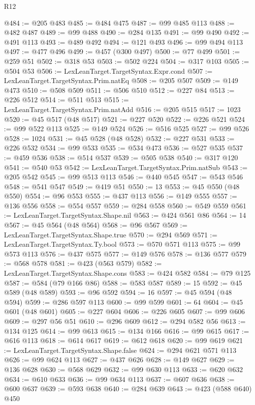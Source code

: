 \begin{lexlean}{R12}
\begin{coremodule}
{{{{{{{{{{{{{{{{{{{{{{{{{{{{{{{{{{{{{{{{{{{{{{{{{{{{{{{{{{{{{{{{{{{{{{{{{{{{{{{{{{{{{{{{{{{{{{{{{{{{{{{{{{@484 := @205 @483
@485 := @484 @475
@487 := @99 @485 @113
@488 := @482 @487
@489 := @99 @488
@490 := @284 @135
@491 := @99 @490
@492 := @491 @113
@493 := @489 @492
@494 := @121 @493
@496 := @99 @494 @113
@497 := @477 @496
@499 := @457 (@300 @497)
@500 := @77 @499
@501 := @259 @51
@502 := @318 @53
@503 := @502 @224
@504 := @317 @103
@505 := @504 @53
@506 := LexLeanTarget.TargetSyntax.Expr.cond
@507 := LexLeanTarget.TargetSyntax.Prim.natEq
@508 := @205 @507
@509 := @149 @473
@510 := @508 @509
@511 := @506 @510
@512 := @227 @84
@513 := @226 @512
@514 := @511 @513
@515 := LexLeanTarget.TargetSyntax.Prim.natAdd
@516 := @205 @515
@517 := 1023
@520 := @45 @517 (@48 @517)
@521 := @227 @520
@522 := @226 @521
@524 := @99 @522 @113
@525 := @149 @524
@526 := @516 @525
@527 := @99 @526
@528 := 1024
@531 := @45 @528 (@48 @528)
@532 := @227 @531
@533 := @226 @532
@534 := @99 @533
@535 := @534 @473
@536 := @527 @535
@537 := @459 @536
@538 := @514 @537
@539 := @505 @538
@540 := @317 @120
@541 := @540 @53
@542 := LexLeanTarget.TargetSyntax.Prim.natSub
@543 := @205 @542
@545 := @99 @513 @113
@546 := @440 @545
@547 := @543 @546
@548 := @541 @547
@549 := @419 @51
@550 := 13
@553 := @45 @550 (@48 @550)
@554 := @96 @553
@555 := @437 @113
@556 := @149 @555
@557 := @136 @556
@558 := @554 @557
@559 := @284 @558
@560 := @549 @559
@561 := LexLeanTarget.TargetSyntax.Shape.nil
@563 := @424 @561 @86
@564 := 14
@567 := @45 @564 (@48 @564)
@568 := @96 @567
@569 := LexLeanTarget.TargetSyntax.Shape.true
@570 := @294 @569
@571 := LexLeanTarget.TargetSyntax.Ty.bool
@573 := @570 @571 @113
@575 := @99 @573 @113
@576 := @437 @575
@577 := @149 @576
@578 := @136 @577
@579 := @568 @578
@581 := @423 (@563 @579)
@582 := LexLeanTarget.TargetSyntax.Shape.cons
@583 := @424 @582
@584 := @79 @125
@587 := @584 (@79 @166 @86)
@588 := @583 @587
@589 := 15
@592 := @45 @589 (@48 @589)
@593 := @96 @592
@594 := 16
@597 := @45 @594 (@48 @594)
@599 := @286 @597 @113
@600 := @99 @599
@601 := 64
@604 := @45 @601 (@48 @601)
@605 := @227 @604
@606 := @226 @605
@607 := @99 @606
@609 := @297 @56 @51
@610 := @296 @609
@612 := @294 @582 @56
@613 := @134 @125
@614 := @99 @613
@615 := @134 @166
@616 := @99 @615
@617 := @616 @113
@618 := @614 @617
@619 := @612 @618
@620 := @99 @619
@621 := LexLeanTarget.TargetSyntax.Shape.false
@624 := @294 @621 @571 @113
@626 := @99 @624 @113
@627 := @437 @626
@628 := @149 @627
@629 := @136 @628
@630 := @568 @629
@632 := @99 @630 @113
@633 := @620 @632
@634 := @610 @633
@636 := @99 @634 @113
@637 := @607 @636
@638 := @600 @637
@639 := @593 @638
@640 := @284 @639
@643 := @423 (@588 @640) @450
}}}}}}}}}}}}}}}}}}}}}}}}}}}}}}}}}}}}}}}}}}}}}}}}}}}}}}}}}}}}}}}}}}}}}}}}}}}}}}}}}}}}}}}}}}}}}}}}}}}}}}}}}}
\end{coremodule}
\end{lexlean}
